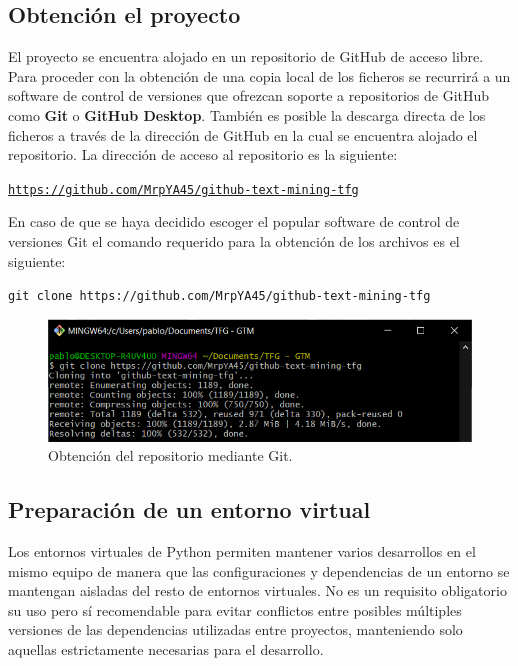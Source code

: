 \subsection{Obtención el proyecto}

El proyecto se encuentra alojado en un repositorio de GitHub de acceso libre. Para proceder con la obtención de una copia local de los ficheros se recurrirá a un software de control de versiones que ofrezcan soporte a repositorios de GitHub como \textbf{Git} o \textbf{GitHub Desktop}. También es posible la descarga directa de los ficheros a través de la dirección de GitHub en la cual se encuentra alojado el repositorio. La dirección de acceso al repositorio es la siguiente:

\vspace{0.5cm}
\centerline{\texttt{\url{https://github.com/MrpYA45/github-text-mining-tfg}}}
\vspace{0.4cm}

En caso de que se haya decidido escoger el popular software de control de versiones Git el comando requerido para la obtención de los archivos es el siguiente:

\vspace{0.5cm}
\centerline{\texttt{git clone https://github.com/MrpYA45/github-text-mining-tfg}}
\vspace{0.4cm}

\begin{figure}[!ht]
	\centering
    \includegraphics[width=\textwidth]{img/git_gtm.png}
	\caption{Obtención del repositorio mediante Git.}
	\label{fig:git_gtm_mp}
\end{figure}

\subsection{Preparación de un entorno virtual}

Los entornos virtuales de Python permiten mantener varios desarrollos en el mismo equipo de manera que las configuraciones y dependencias de un entorno se mantengan aisladas del resto de entornos virtuales. No es un requisito obligatorio su uso pero sí recomendable para evitar conflictos entre posibles múltiples versiones de las dependencias utilizadas entre proyectos, manteniendo solo aquellas estrictamente necesarias para el desarrollo. 

